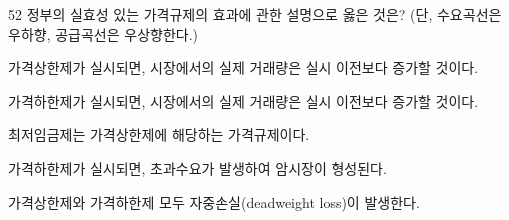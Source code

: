 \begin{question}{52}
정부의 실효성 있는 가격규제의 효과에 관한 설명으로 옳은 것은? (단, 수요곡선은 우하향, 공급곡선은 우상향한다.)
\begin{choices}
  \item 가격상한제가 실시되면, 시장에서의 실제 거래량은 실시 이전보다 증가할 것이다.
  \item 가격하한제가 실시되면, 시장에서의 실제 거래량은 실시 이전보다 증가할 것이다.
  \item 최저임금제는 가격상한제에 해당하는 가격규제이다.
  \item 가격하한제가 실시되면, 초과수요가 발생하여 암시장이 형성된다.
  \item 가격상한제와 가격하한제 모두 자중손실(deadweight loss)이 발생한다.
\end{choices}
\end{question}
